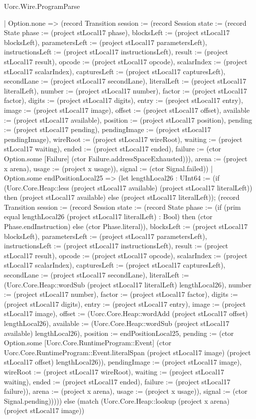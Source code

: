 \begin{lexlean}{Uorc.Wire.ProgramParse}
\begin{semanticmodule}
{        | Option.none => (record Transition {session := (record Session {state := (record State {phase := (project stLocal17 phase), blocksLeft := (project stLocal17 blocksLeft), parametersLeft := (project stLocal17 parametersLeft), instructionsLeft := (project stLocal17 instructionsLeft), result := (project stLocal17 result), opcode := (project stLocal17 opcode), scalarIndex := (project stLocal17 scalarIndex), capturesLeft := (project stLocal17 capturesLeft), secondLane := (project stLocal17 secondLane), literalLeft := (project stLocal17 literalLeft), number := (project stLocal17 number), factor := (project stLocal17 factor), digits := (project stLocal17 digits), entry := (project stLocal17 entry), image := (project stLocal17 image), offset := (project stLocal17 offset), available := (project stLocal17 available), position := (project stLocal17 position), pending := (project stLocal17 pending), pendingImage := (project stLocal17 pendingImage), wireRoot := (project stLocal17 wireRoot), waiting := (project stLocal17 waiting), ended := (project stLocal17 ended), failure := (ctor Option.some [Failure] (ctor Failure.addressSpaceExhausted))}), arena := (project x arena), usage := (project x usage)}), signal := (ctor Signal.failed)})
        | Option.some endPositionLocal25 => (let lengthLocal26 : UInt64 := (if (Uorc.Core.Heap::less (project stLocal17 available) (project stLocal17 literalLeft)) then (project stLocal17 available) else (project stLocal17 literalLeft)); (record Transition {session := (record Session {state := (record State {phase := (if (prim equal lengthLocal26 (project stLocal17 literalLeft) : Bool) then (ctor Phase.endInstruction) else (ctor Phase.literal)), blocksLeft := (project stLocal17 blocksLeft), parametersLeft := (project stLocal17 parametersLeft), instructionsLeft := (project stLocal17 instructionsLeft), result := (project stLocal17 result), opcode := (project stLocal17 opcode), scalarIndex := (project stLocal17 scalarIndex), capturesLeft := (project stLocal17 capturesLeft), secondLane := (project stLocal17 secondLane), literalLeft := (Uorc.Core.Heap::wordSub (project stLocal17 literalLeft) lengthLocal26), number := (project stLocal17 number), factor := (project stLocal17 factor), digits := (project stLocal17 digits), entry := (project stLocal17 entry), image := (project stLocal17 image), offset := (Uorc.Core.Heap::wordAdd (project stLocal17 offset) lengthLocal26), available := (Uorc.Core.Heap::wordSub (project stLocal17 available) lengthLocal26), position := endPositionLocal25, pending := (ctor Option.some [Uorc.Core.RuntimeProgram::Event] (ctor Uorc.Core.RuntimeProgram::Event.literalSpan (project stLocal17 image) (project stLocal17 offset) lengthLocal26)), pendingImage := (project stLocal17 image), wireRoot := (project stLocal17 wireRoot), waiting := (project stLocal17 waiting), ended := (project stLocal17 ended), failure := (project stLocal17 failure)}), arena := (project x arena), usage := (project x usage)}), signal := (ctor Signal.pending)})))) else (match (Uorc.Core.Heap::lookup (project x arena) (project stLocal17 image))
}
\end{semanticmodule}
\end{lexlean}
